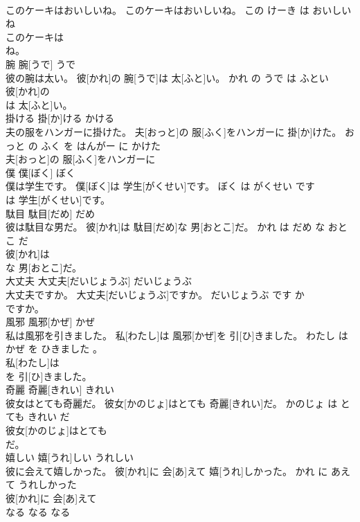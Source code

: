 \documentclass[8pt]{extreport}
\begin{document}
\begin{CJK}{UTF8}{min}
\\	このケーキはおいしいね。	このケーキはおいしいね。	この けーき は おいしい ね	
\\	このケーキは
\\	ね。			
\\	腕	腕[うで]	うで	
\\	彼の腕は太い。	彼[かれ]の 腕[うで]は 太[ふと]い。	かれ の うで は ふとい	
\\	彼[かれ]の
\\	は 太[ふと]い。			
\\	掛ける	掛[か]ける	かける	
\\	夫の服をハンガーに掛けた。	夫[おっと]の 服[ふく]をハンガーに 掛[か]けた。	おっと の ふく を はんがー に かけた	
\\	夫[おっと]の 服[ふく]をハンガーに
\\	僕	僕[ぼく]	ぼく	
\\	僕は学生です。	僕[ぼく]は 学生[がくせい]です。	ぼく は がくせい です	
\\	は 学生[がくせい]です。			
\\	駄目	駄目[だめ]	だめ	
\\	彼は駄目な男だ。	彼[かれ]は 駄目[だめ]な 男[おとこ]だ。	かれ は だめ な おとこ だ	
\\	彼[かれ]は
\\	な 男[おとこ]だ。			
\\	大丈夫	大丈夫[だいじょうぶ]	だいじょうぶ	
\\	大丈夫ですか。	大丈夫[だいじょうぶ]ですか。	だいじょうぶ です か	
\\	ですか。			
\\	風邪	風邪[かぜ]	かぜ	
\\	私は風邪を引きました。	私[わたし]は 風邪[かぜ]を 引[ひ]きました。	わたし は かぜ を ひきました 。	
\\	私[わたし]は
\\	を 引[ひ]きました。			
\\	奇麗	奇麗[きれい]	きれい	
\\	彼女はとても奇麗だ。	彼女[かのじょ]はとても 奇麗[きれい]だ。	かのじょ は とても きれい だ	
\\	彼女[かのじょ]はとても
\\	だ。			
\\	嬉しい	嬉[うれ]しい	うれしい	
\\	彼に会えて嬉しかった。	彼[かれ]に 会[あ]えて 嬉[うれ]しかった。	かれ に あえて うれしかった	
\\	彼[かれ]に 会[あ]えて
\\	なる	なる	なる	

\end{CJK}
\end{document}
